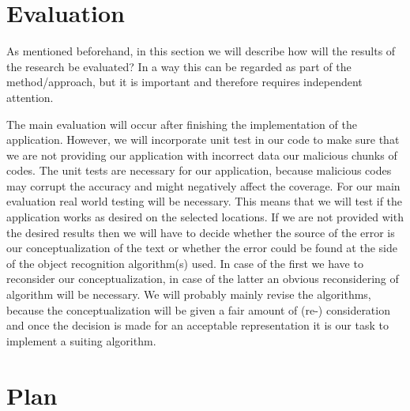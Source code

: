 \documentclass[12pt ,twocolumn]{article}
\begin{document}
\section{Evaluation}\label{evaluation}
As mentioned beforehand, in this section we will describe how will the results of the research be evaluated? In a way this can be regarded as part of the method/approach, but it is important and therefore requires independent attention. 

The main evaluation will occur after finishing the implementation of the application. However, we will incorporate unit test in our code to make sure that we are not providing our application with incorrect data our malicious chunks of codes. The unit tests are necessary for our application, because malicious codes may corrupt the accuracy and might negatively affect the coverage.
	For our main evaluation real world testing will be necessary. This means that we will test if the application works as desired on the selected locations. If we are not provided with the desired results then we will have to decide whether the source of the error is our conceptualization of the text or whether the error could be found at the side of the object recognition algorithm(s) used. In case of the first we have to reconsider our conceptualization, in case of the latter an obvious reconsidering of algorithm will be necessary. We will probably mainly revise the algorithms, because the conceptualization will be given a fair amount of (re-) consideration and once the decision is made for an acceptable representation it is our task to implement a suiting algorithm.

\section{Plan}\label{plan}
\end{document}
